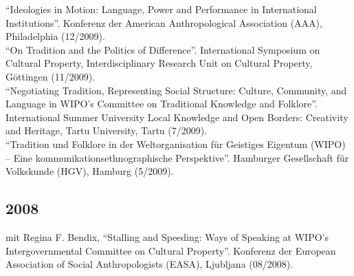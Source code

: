 \enquote{Ideologies in Motion: Language, Power and Performance in International Institutions}. Konferenz der American Anthropological Association (AAA), Philadelphia (12/2009).\\[.25cm]\enquote{On Tradition and the Politics of Difference}. International Symposium on Cultural Property, Interdisciplinary Research Unit on Cultural Property, Göttingen (11/2009).\\[.25cm]\enquote{Negotiating Tradition, Representing Social Structure: Culture, Community, and Language in WIPO’s Committee on Traditional Knowledge and Folklore}. International Summer University Local Knowledge and Open Borders: Creativity and Heritage, Tartu University, Tartu (7/2009).\\[.25cm]\enquote{Tradition und Folklore in der Weltorganisation für Geistiges Eigentum (WIPO) – Eine kommunikationsethnographische Perspektive}. Hamburger Gesellschaft für Volkskunde (HGV), Hamburg (5/2009).\subsection*{2008}
mit Regina F. Bendix, \enquote{Stalling and Speeding: Ways of Speaking at WIPO’s Intergovernmental Committee on Cultural Property}. Konferenz der European Association of Social Anthropologists (EASA), Ljubljana (08/2008).  
  
